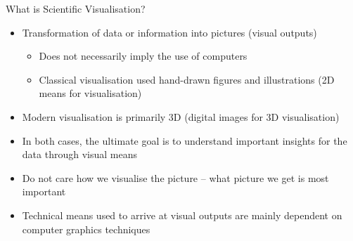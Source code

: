 \documentclass{beamer}
\begin{document}
%
%
%    
%

\begin{frame}{What is Scientific Visualisation?}

\begin{itemize}
    \item Transformation of data or information into pictures (visual outputs)
    \begin{itemize}
        \item Does not necessarily imply the use of computers
        \item Classical visualisation used hand-drawn figures and illustrations (2D means for visualisation)
    \end{itemize}{}
    \item Modern visualisation is primarily 3D (digital images for 3D visualisation)
    \item In both cases, the ultimate goal is to understand important insights for the data through visual means
    \item Do not care how we visualise the picture -- what picture we get is most important
    \item Technical means used to arrive at visual outputs are mainly dependent on computer graphics techniques
\end{itemize}{}

\end{frame}{}
\end{document}
